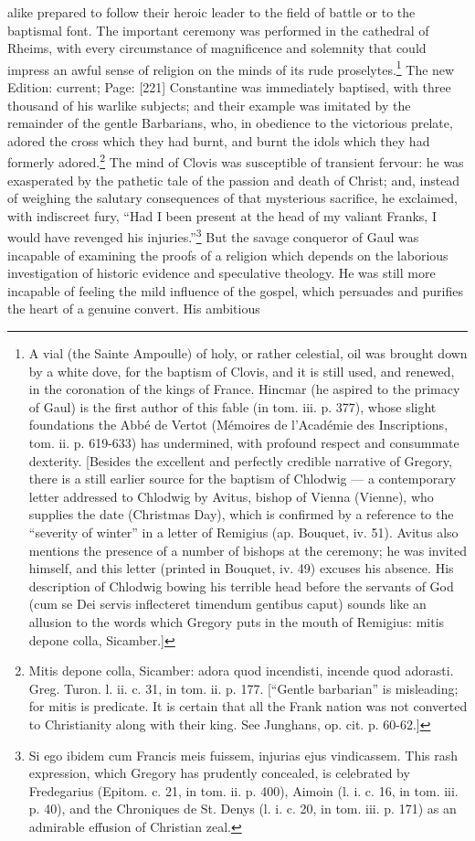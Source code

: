 alike prepared to follow their heroic leader to the field of battle or to the baptismal font. The important ceremony was performed in the cathedral of Rheims, with every circumstance of magnificence and solemnity that could impress an awful sense of religion on the minds of its rude proselytes.\footnote{A vial (the Sainte Ampoulle) of holy, or rather celestial, oil was brought down by a white dove, for the baptism of Clovis, and it is still used, and renewed, in the coronation of the kings of France. Hincmar (he aspired to the primacy of Gaul) is the first author of this fable (in tom. iii. p. 377), whose slight foundations the Abbé de Vertot (Mémoires de l\texthebrew{}’Académie des Inscriptions, tom. ii. p. 619-633) has undermined, with profound respect and consummate dexterity. [Besides the excellent and perfectly credible narrative of Gregory, there is a still earlier source for the baptism of Chlodwig \texthebrew{—} a contemporary letter addressed to Chlodwig by Avitus, bishop of Vienna (Vienne), who supplies the date (Christmas Day), which is confirmed by a reference to the \texthebrew{“}severity of winter\texthebrew{}” in a letter of Remigius (ap. Bouquet, iv. 51). Avitus also mentions the presence of a number of bishops at the ceremony; he was invited himself, and this letter (printed in Bouquet, iv. 49) excuses his absence. His description of Chlodwig bowing his terrible head before the servants of God (cum se Dei servis inflecteret timendum gentibus caput) sounds like an allusion to the words which Gregory puts in the mouth of Remigius: mitis depone colla, Sicamber.]} The new Edition: current; Page: [221] Constantine was immediately baptised, with three thousand of his warlike subjects; and their example was imitated by the remainder of the gentle Barbarians, who, in obedience to the victorious prelate, adored the cross which they had burnt, and burnt the idols which they had formerly adored.\footnote{Mitis depone colla, Sicamber: adora quod incendisti, incende quod adorasti. Greg. Turon. l. ii. c. 31, in tom. ii. p. 177. [\texthebrew{“}Gentle barbarian\texthebrew{}” is misleading; for mitis is predicate. It is certain that all the Frank nation was not converted to Christianity along with their king. See Junghans, op. cit. p. 60-62.]} The mind of Clovis was susceptible of transient fervour: he was exasperated by the pathetic tale of the passion and death of Christ; and, instead of weighing the salutary consequences of that mysterious sacrifice, he exclaimed, with indiscreet fury, \texthebrew{“}Had I been present at the head of my valiant Franks, I would have revenged his injuries.\texthebrew{}”\footnote{Si ego ibidem cum Francis meis fuissem, injurias ejus vindicassem. This rash expression, which Gregory has prudently concealed, is celebrated by Fredegarius (Epitom. c. 21, in tom. ii. p. 400), Aimoin (l. i. c. 16, in tom. iii. p. 40), and the Chroniques de St. Denys (l. i. c. 20, in tom. iii. p. 171) as an admirable effusion of Christian zeal.} But the savage conqueror of Gaul was incapable of examining the proofs of a religion which depends on the laborious investigation of historic evidence and speculative theology. He was still more incapable of feeling the mild influence of the gospel, which persuades and purifies the heart of a genuine convert. His ambitious 